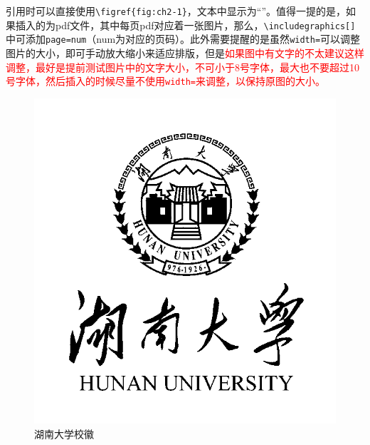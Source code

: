 引用时可以直接使用\lstinline!\figref{fig:ch2-1}!，文本中显示为“”。值得一提的是，如果插入的为pdf文件，其中每页pdf对应着一张图片，那么，\lstinline!\includegraphics[]!中可添加\lstinline!page=num!（num为对应的页码）。此外需要提醒的是虽然\lstinline!width=!可以调整图片的大小，即可手动放大缩小来适应排版，但是\textcolor{red}{如果图中有文字的不太建议这样调整，最好是提前测试图片中的文字大小，不可小于8号字体，最大也不要超过10号字体，然后插入的时候尽量不使用\lstinline!width=!来调整，以保持原图的大小。}
\begin{figure}
    \centering
    \includegraphics[]{figures/hnu-logo.png}
    \caption{湖南大学校徽}
    \label{fig:ch2-1}
\end{figure}

